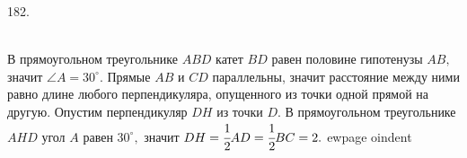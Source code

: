 182. \begin{figure}[ht!]
\end{figure}\\
В прямоугольном треугольнике $ABD$ катет $BD$ равен половине гипотенузы $AB,$ значит $\angle A=30^\circ.$ Прямые $AB$ и $CD$ параллельны, значит расстояние между ними равно длине любого перпендикуляра, опущенного из точки одной прямой на другую. Опустим перпендикуляр $DH$ из точки $D.$ В прямоугольном треугольнике $AHD$ угол $A$ равен $30^\circ,$ значит $DH=\cfrac{1}{2}AD=\cfrac{1}{2}BC=2.$
ewpage
oindent
